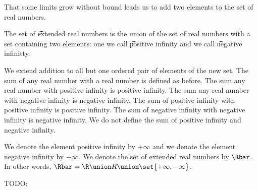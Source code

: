 

That some limits grow without bound leads us to add two elements to the set of real numbers.


The set of
\t{extended real numbers}
is the union of
the set of real numbers
with a set containing
two elements:
one we call
\t{positive infinity}
and we call
\t{negative infinitty}.


We extend addition to all
but one ordered pair of elements
of the new set.
The sum of any real number with
a real number is defined as before.
The sum any real number with positive
infinity is positive infinity.
The sum any real number with negative
infinity is negative infinity.
The sum of positive infinity with
positive infinity is positive infinity.
The sum of negative infinity with
negative infinity is negative infinity.
We do not define the sum of
positive infinity and negative infinity.


We denote the element positive infinity by $+\infty$ and we denote the element negative infinity by $-\infty$.
We denote the set of extended real numbers by $\Rbar$.
In other words, $\Rbar = \R \union R \union \set{+\infty,-\infty}$.



TODO:
